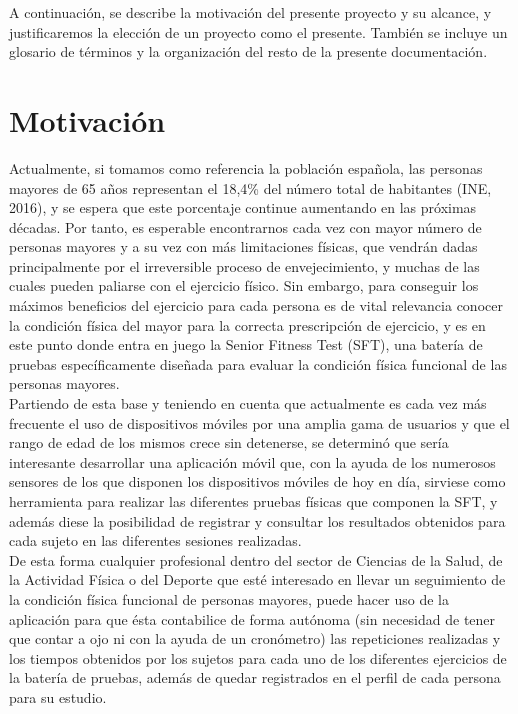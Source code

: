 

A continuación, se describe la motivación del presente proyecto y su alcance, y justificaremos la elección de un proyecto como el presente. También se incluye un glosario de términos y la organización del resto de la presente documentación.

\section{Motivación}

Actualmente, si tomamos como referencia la población española, las personas mayores de 65 años representan el 18,4\% del número total de habitantes (INE, 2016), y se espera que este porcentaje continue aumentando en las próximas décadas. Por tanto, es esperable encontrarnos cada vez con mayor número de personas mayores y a su vez con más limitaciones físicas, que vendrán dadas principalmente por el irreversible proceso de envejecimiento, y muchas de las cuales pueden paliarse con el ejercicio físico. Sin embargo, para conseguir los máximos beneficios del ejercicio para cada persona es de vital relevancia conocer la condición física del mayor para la correcta prescripción de ejercicio, y es en este punto donde entra en juego la Senior Fitness Test (SFT), una batería de pruebas específicamente diseñada para evaluar la condición física funcional de las personas mayores.\\

Partiendo de esta base y teniendo en cuenta que actualmente es cada vez más frecuente el uso de dispositivos móviles por una amplia gama de usuarios y que el rango de edad de los mismos crece sin detenerse, se determinó que sería interesante desarrollar una aplicación móvil que, con la ayuda de los numerosos sensores de los que disponen los dispositivos móviles de hoy en día, sirviese como herramienta para realizar las diferentes pruebas físicas que componen la SFT, y además diese la posibilidad de registrar y consultar los resultados obtenidos para cada sujeto en las diferentes sesiones realizadas.\\

De esta forma cualquier profesional dentro del sector de Ciencias de la Salud, de la Actividad Física o del Deporte que esté interesado en llevar un seguimiento de la condición física funcional de personas mayores, puede hacer uso de la aplicación para que ésta contabilice de forma autónoma (sin necesidad de tener que contar a ojo ni con la ayuda de un cronómetro) las repeticiones realizadas y los tiempos obtenidos por los sujetos para cada uno de los diferentes ejercicios de la batería de pruebas, además de quedar registrados en el perfil de cada persona para su estudio.\\

